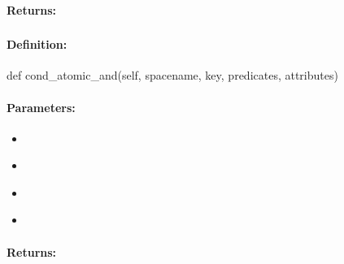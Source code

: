 \paragraph{Returns:}


\pagebreak
\subsubsection{}
\label{api:python:cond_atomic_and}


\paragraph{Definition:}
\begin{pythoncode}
def cond_atomic_and(self, spacename, key, predicates, attributes)
\end{pythoncode}

\paragraph{Parameters:}
\begin{itemize}[noitemsep]
\item {}\\

\item {}\\

\item {}\\

\item {}\\

\end{itemize}

\paragraph{Returns:}


\pagebreak
\subsubsection{}
\label{api:python:async_cond_atomic_and}


